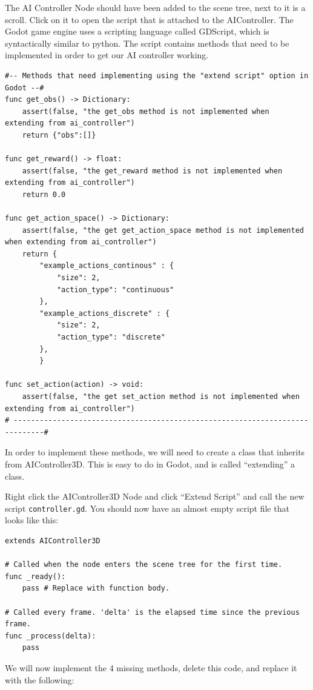 \documentclass[11pt,a4paper]{article}
\begin{document}
The AI Controller Node should have been added to the scene tree, next to it is a scroll. Click on it to open the script that is attached to the AIController. The Godot game engine uses a scripting language called GDScript, which is syntactically similar to python. The script contains methods that need to be implemented in order to get our AI controller working.

\begin{lstlisting}
#-- Methods that need implementing using the "extend script" option in Godot --#
func get_obs() -> Dictionary:
	assert(false, "the get_obs method is not implemented when extending from ai_controller")
	return {"obs":[]}

func get_reward() -> float:
	assert(false, "the get_reward method is not implemented when extending from ai_controller")
	return 0.0

func get_action_space() -> Dictionary:
	assert(false, "the get get_action_space method is not implemented when extending from ai_controller")
	return {
		"example_actions_continous" : {
			"size": 2,
			"action_type": "continuous"
		},
		"example_actions_discrete" : {
			"size": 2,
			"action_type": "discrete"
		},
		}

func set_action(action) -> void:
	assert(false, "the get set_action method is not implemented when extending from ai_controller")
# -----------------------------------------------------------------------------#
\end{lstlisting}

In order to implement these methods, we will need to create a class that inherits from AIController3D. This is easy to do in Godot, and is called ``extending'' a class.

Right click the AIController3D Node and click ``Extend Script'' and call the new script \texttt{controller.gd}. You should now have an almost empty script file that looks like this:

\begin{lstlisting}
extends AIController3D

# Called when the node enters the scene tree for the first time.
func _ready():
	pass # Replace with function body.

# Called every frame. 'delta' is the elapsed time since the previous frame.
func _process(delta):
	pass
\end{lstlisting}

We will now implement the 4 missing methods, delete this code, and replace it with the following:
\end{document}
